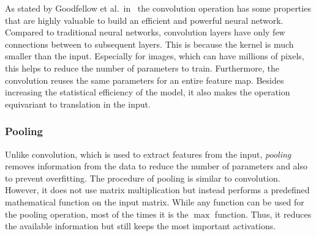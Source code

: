 As stated by Goodfellow et al.\ in~\cite{DLbook16} the convolution operation has some properties that are highly valuable to build an efficient and powerful neural network. Compared to traditional neural networks, convolution layers have only few connections between to subsequent layers. This is because the kernel is much smaller than the input. Especially for images, which can have millions of pixels, this helps to reduce the number of parameters to train.  Furthermore, the convolution reuses the same parameters for an entire feature map. Besides increasing the statistical efficiency of the model, it also makes the operation equivariant to translation in the input.

\subsubsection{Pooling}
\label{sec:pooling}
Unlike convolution, which is used to extract features from the input, \emph{pooling} removes information from the data to reduce the number of parameters and also to prevent overfitting. The procedure of pooling is similar to convolution. However, it does not use matrix multiplication but instead performs a predefined mathematical function on the input matrix. While any function can be used for the pooling operation, most of the times it is the $\max$ function. Thus, it reduces the available information but still keeps the most important activations.~\cite[p.~369 f]{praxiseinstieg_ml17}


